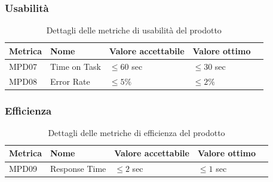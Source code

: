 \documentclass[a4paper,12pt]{article}
\begin{document}
{{        \subsubsection{Usabilità}
        \leavevmode
                \begin{table}[H]
                \centering
                    \begin{tabular}{|l|l|l|l|l|}
                        \hline
                        \rowcolor{gold}
                        \textbf{Metrica} & \textbf{Nome} & \textbf{Valore accettabile} & \textbf{Valore ottimo} \\
                        \hline
                        MPD07 & Time on Task & $\le 60$ sec & $\le 30$ sec \\
                        \hline
                        MPD08 & Error Rate & $\le 5\%$ & $\le 2\%$ \\
                        \hline
                    \end{tabular}
                    \caption{Dettagli delle metriche di usabilità del prodotto}
                    \label{tab:metriche-usabilità}
                \end{table}

        \subsubsection{Efficienza}
        \leavevmode
                \begin{table}[H]
                \centering
                    \begin{tabular}{|l|l|l|l|l|}
                        \hline
                        \rowcolor{gold}
                        \textbf{Metrica} & \textbf{Nome} & \textbf{Valore accettabile} & \textbf{Valore ottimo} \\
                        \hline
                        MPD09 & Response Time & $\le 2$ sec & $\le 1$ sec \\
                        \hline
                    \end{tabular}
                    \caption{Dettagli delle metriche di efficienza del prodotto}
                    \label{tab:metriche-efficienza}
                \end{table}

}}
\end{document}
